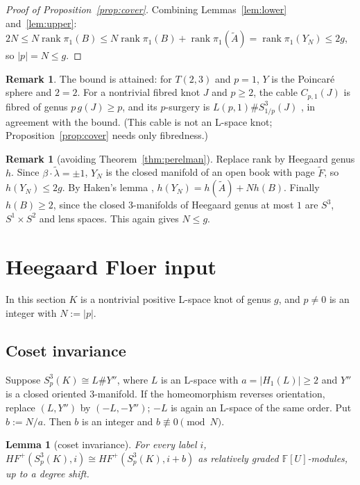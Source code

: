 \documentclass[11pt]{article}
\newtheorem{lemma}[theorem]{Lemma}
\theoremstyle{definition}
\newtheorem{remark}[theorem]{Remark}
\newcommand{\F}{\mathbb{F}}
\newcommand{\HFp}{\mathit{HF}^+}
\newcommand{\rk}{\operatorname{rank}}
\begin{document}
\begin{proof}[Proof of Proposition~\ref{prop:cover}]
Combining Lemmas~\ref{lem:lower} and~\ref{lem:upper}: $2N\le N\rk\pi_1(B)\le N\rk\pi_1(B)+\rk\pi_1(\tilde A)=\rk\pi_1(Y_N)\le2g$, so $|p|=N\le g$.
\end{proof}

\begin{remark}
The bound is attained: for $T(2,3)$ and $p=1$, $Y$ is the Poincar\'e sphere and $2=2$. For a nontrivial fibred knot $J$ and $p\ge2$, the cable $C_{p,1}(J)$ is fibred of genus $p\,g(J)\ge p$, and its $p$-surgery is $L(p,1)\#S^3_{1/p}(J)$ \cite{Gordon83}, in agreement with the bound. (This cable is not an L-space knot; Proposition~\ref{prop:cover} needs only fibredness.)
\end{remark}

\begin{remark}[avoiding Theorem~\ref{thm:perelman}]\label{rem:noperelman}
Replace rank by Heegaard genus $h$. Since $\beta\cdot\tilde\lambda=\pm1$, $Y_N$ is the closed manifold of an open book with page $\tilde F$, so $h(Y_N)\le2g$. By Haken's lemma \cite{Haken}, $h(Y_N)=h(\tilde A)+N h(B)$. Finally $h(B)\ge2$, since the closed $3$-manifolds of Heegaard genus at most $1$ are $S^3$, $S^1\times S^2$ and lens spaces. This again gives $N\le g$.
\end{remark}

\section{Heegaard Floer input}\label{sec:HF}

In this section $K$ is a nontrivial positive L-space knot of genus $g$, and $p\ne0$ is an integer with $N:=|p|$.

\subsection{Coset invariance}

Suppose $S^3_p(K)\cong L\#Y''$, where $L$ is an L-space with $a=|H_1(L)|\ge2$ and $Y''$ is a closed oriented $3$-manifold. If the homeomorphism reverses orientation, replace $(L,Y'')$ by $(-L,-Y'')$; $-L$ is again an L-space of the same order. Put $b:=N/a$. Then $b$ is an integer and $b\not\equiv0\pmod N$.

\begin{lemma}[coset invariance]\label{lem:coset}
For every label $i$, $\HFp(S^3_p(K),i)\cong\HFp(S^3_p(K),i+b)$ as relatively graded $\F[U]$-modules, up to a degree shift.
\end{lemma}
\end{document}
